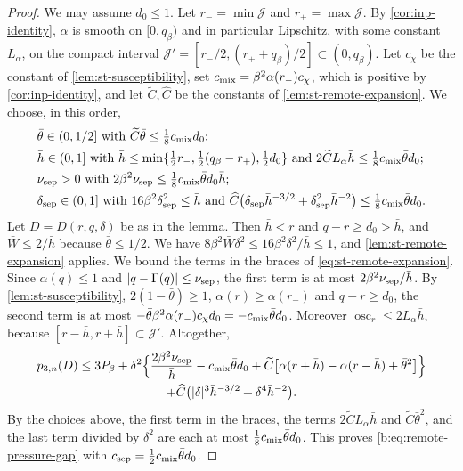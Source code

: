 \begin{proof}
We may assume $d_0\le1$. Let $r_-=\min\mathcal J$ and $r_+=\max\mathcal J$. By \cref{cor:inp-identity}, $\alpha$ is smooth on $[0,q_\beta)$ and in particular Lipschitz, with some constant $L_\alpha$, on the compact interval $\mathcal J'=[r_-/2,(r_++q_\beta)/2]\subset(0,q_\beta)$. Let $c_\chi$ be the constant of \cref{lem:st-susceptibility}, set $c_{\rm mix}=\beta^2\alpha(r_-)c_\chi$, which is positive by \cref{cor:inp-identity}, and let $\widetilde C,\widehat C$ be the constants of \cref{lem:st-remote-expansion}. We choose, in this order,
\begin{align*}
 &\bar\theta\in(0,1/2]\ \text{with}\ \widetilde C\bar\theta\le\tfrac18c_{\rm mix}d_0;\\
 &\bar h\in(0,1]\ \text{with}\ \bar h\le\min\{\tfrac12r_-,\tfrac12(q_\beta-r_+),\tfrac12d_0\}\ \text{and}\ 2\widetilde CL_\alpha\bar h\le\tfrac18c_{\rm mix}\bar\theta d_0;\\
 &\nu_{\rm sep}>0\ \text{with}\ 2\beta^2\nu_{\rm sep}\le\tfrac18c_{\rm mix}\bar\theta d_0\bar h;\\
 &\delta_{\rm sep}\in(0,1]\ \text{with}\ 16\beta^2\delta_{\rm sep}^2\le \bar h\ \text{and}\ \widehat C\bigl(\delta_{\rm sep}\bar h^{-3/2}+\delta_{\rm sep}^2\bar h^{-2}\bigr)\le\tfrac18c_{\rm mix}\bar\theta d_0.
\end{align*}
Let $D=D(r,q,\delta)$ be as in the lemma. Then $\bar h<r$ and $q-r\ge d_0>\bar h$, and $\bar W\le2/\bar h$ because $\bar\theta\le1/2$. We have $8\beta^2\bar W\delta^2\le16\beta^2\delta^2/\bar h\le1$, and \cref{lem:st-remote-expansion} applies. We bound the terms in the braces of \eqref{eq:st-remote-expansion}. Since $\alpha(q)\le1$ and $\lvert q-\Gamma(q)\rvert\le\nu_{\rm sep}$, the first term is at most $2\beta^2\nu_{\rm sep}/\bar h$. By \cref{lem:st-susceptibility}, $2(1-\bar\theta)\ge1$, $\alpha(r)\ge\alpha(r_-)$ and $q-r\ge d_0$, the second term is at most $-\bar\theta\beta^2\alpha(r_-)c_\chi d_0=-c_{\rm mix}\bar\theta d_0$. Moreover $\operatorname{osc}_r\le2L_\alpha \bar h$, because $[r-\bar h,r+\bar h]\subset\mathcal J'$. Altogether,
\begin{multline}\label{b:eq:remote-tent-estimate}
 p_{3,n}(D)\le3P_\beta+\delta^2\Bigl\{\frac{2\beta^2\nu_{\rm sep}}{\bar h}-c_{\rm mix}\bar\theta d_0+\widetilde C\bigl[\alpha(r+\bar h)-\alpha(r-\bar h)+\bar\theta^2\bigr]\Bigr\}\\
 +\widehat C\bigl(\lvert \delta\rvert^3\bar h^{-3/2}+\delta^4\bar h^{-2}\bigr).
\end{multline}
By the choices above, the first term in the braces, the terms $2\widetilde CL_\alpha\bar h$ and $\widetilde C\bar\theta^2$, and the last term divided by $\delta^2$ are each at most $\frac18c_{\rm mix}\bar\theta d_0$. This proves \eqref{b:eq:remote-pressure-gap} with $c_{\rm sep}=\frac12c_{\rm mix}\bar\theta d_0$.
\end{proof}

